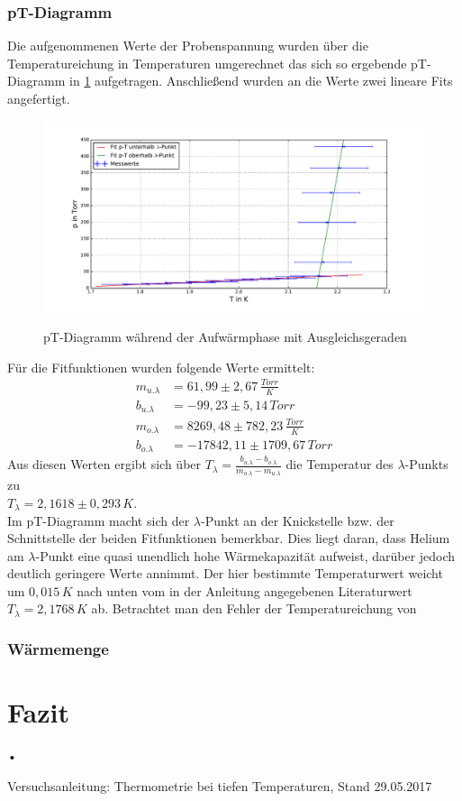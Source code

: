 \documentclass[twoside,colorback,accentcolor=tud4c,11pt]{tudreport}
\begin{document}
\subsection{pT-Diagramm}
Die aufgenommenen Werte der Probenspannung wurden über die Temperatureichung in Temperaturen umgerechnet das sich so ergebende pT-Diagramm in \ref{pTdia} aufgetragen. Anschließend wurden an die Werte zwei lineare Fits angefertigt.
\begin{figure}[H]
\centering
   	\begin{minipage}[b]{1.0\textwidth}
   	\includegraphics[width=\textwidth]{graphics/pT.pdf}
  	\label{pTdia}
   	\end{minipage}
\caption{pT-Diagramm während der Aufwärmphase mit Ausgleichsgeraden}	
\end{figure}
Für die Fitfunktionen wurden folgende Werte ermittelt:
\begin{align}
m_{u.\lambda}&=61,99\pm 2,67 \,\si{\frac{Torr}{K}}\\
b_{u.\lambda}&=-99,23\pm 5,14\,\si{Torr}\\
m_{o.\lambda}&=8269,48\pm 782,23 \,\si{\frac{Torr}{K}}\\
b_{o.\lambda}&=-17842,11\pm 1709,67\,\si{Torr}
\end{align}
Aus diesen Werten ergibt sich über $T_{\lambda}=\frac{b_{u.\lambda}-b_{o.\lambda}}{m_{o.\lambda}-m_{u.\lambda}}$ die Temperatur des $\lambda$-Punkts zu\\ $T_{\lambda}=2,1618\pm 0,293\,\si{K}$.\\
Im pT-Diagramm macht sich der $\lambda$-Punkt an der Knickstelle bzw. der Schnittstelle der beiden Fitfunktionen bemerkbar. Dies liegt daran, dass Helium am $\lambda$-Punkt eine quasi unendlich hohe Wärmekapazität aufweist, darüber jedoch deutlich geringere Werte annimmt. Der hier bestimmte Temperaturwert  weicht um $0,015\,\si{K}$ nach unten vom in der Anleitung angegebenen Literaturwert $T_{\lambda}=2,1768\,\si{K}$ ab. Betrachtet man den Fehler der Temperatureichung von 
\subsection{Wärmemenge}
\chapter{Fazit}	
•
\renewcommand{\bibname}{Literatur}
\begin{thebibliography}{0}
 Versuchsanleitung: Thermometrie bei tiefen Temperaturen, Stand 29.05.2017

\end{thebibliography}
\end{document}
